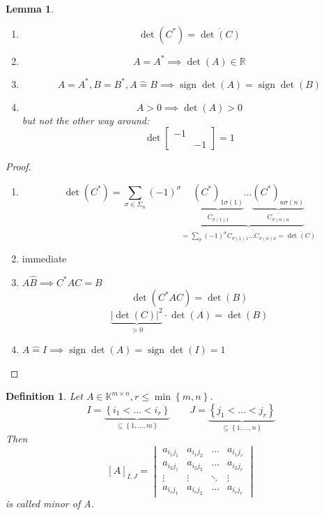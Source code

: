 \documentclass{article}
\newcounter{lecref}[section]
\numberwithin{lecref}{section}
\newtheorem{definition}[lecref]{Definition}
\newtheorem{lemma}[lecref]{Lemma}
\newcommand{\set}[1]{\left\{#1\right\}}
\newcommand{\card}[1]{\left|#1\right|}
\DeclareMathOperator{\sign}{sign}
\begin{document}
\begin{lemma}
  \begin{enumerate}
    \item \[ \det(C^*) = \overline{\det(C)} \]
    \item \[ A = A^* \implies \det(A) \in \mathbb R \]
    \item \[ A = A^*, B = B^*, A \hat= B \implies \sign{\det(A)} = \sign{\det(B)} \]
    \item \[ A > 0 \implies \det(A) > 0 \]
      but not the other way around:
      \[ \det\begin{bmatrix} -1 & \\ & -1 \end{bmatrix} = 1 \]
  \end{enumerate}
\end{lemma}

\begin{proof}
  \begin{enumerate}
    \item
      \[ \det(C^*) = \sum_{\sigma \in \Sigma_n} (-1)^\sigma \underbrace{\underbrace{(C^*)_{1 \sigma(1)}}_{\overline{C_{\sigma(1) 1}}} \ldots \underbrace{(C^*)_{n \sigma(n)}}_{\overline{C_{\sigma(n) n}}}}_{= \overline{\sum_{\sigma} (-1)^\sigma C_{\sigma(1) 1} \ldots C_{\sigma(n) n} = \overline{\det(C)} }} \]
    \item immediate
    \item $A \hat B \implies C^* AC = B$
      \[ \det(C^* AC) = \det(B) \]
      \[ \underbrace{\card{\det(C)}^2}_{>0} \cdot \det(A) = \det(B) \]
    \item $A \hat= I \implies \sign{\det(A)} = \sign{\det(I)} = 1$
  \end{enumerate}
\end{proof}

\begin{definition} %
  Let $A \in \mathbb K^{m \times n}, r \leq \min\set{m,n}$.
  \[ I = \underbrace{\set{i_1 < \ldots < i_r}}_{\subseteq \set{1, \ldots, m}} \qquad J = \underbrace{\set{j_1 < \ldots < j_r}}_{\subseteq \set{1, \ldots, n}} \]
  Then
  \[
    \left[A\right]_{I,J} =
    \begin{vmatrix}
      a_{i_1 j_1} & a_{i_1 j_2} & \ldots & a_{i_1 j_r} \\
      a_{i_2 j_1} & a_{i_2 j_2} & \ldots & a_{i_2 j_r} \\
      \vdots & \vdots & \ddots & \vdots \\
      a_{i_r j_1} & a_{i_r j_2} & \ldots & a_{i_r j_r}
    \end{vmatrix}
  \]
  is called \emph{minor of A}.
\end{definition}
\end{document}
